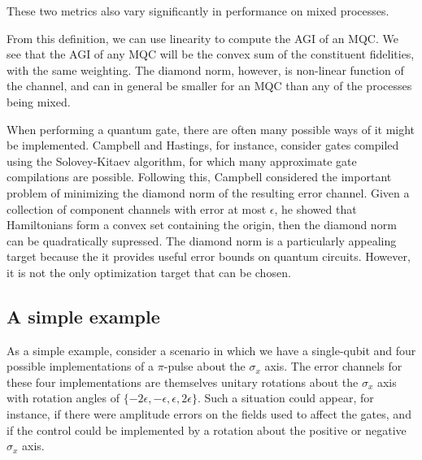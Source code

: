 \documentclass[aps,nofootinbib,pra,notitlepage,twocolumn]{revtex4-1}
\newcommand{\actual}{\ensuremath{\tilde{\mathsf{G}}}}
\newcommand{\error}{\ensuremath{{\mathsf{E}}}}
\begin{document}
These two metrics also vary significantly in performance on mixed processes.  

From this definition, we can use linearity to compute the AGI of an MQC. We see that the AGI of any MQC will be the convex sum of the constituent fidelities, with the same weighting. The diamond norm, however, is non-linear function of the channel, and can in general be smaller for an MQC than any of the processes being mixed. 


When performing a quantum gate, there are often many possible ways of it might be implemented. Campbell and Hastings, for instance, consider gates compiled using the Solovey-Kitaev algorithm, for which many approximate gate compilations are possible.\cite{Campbell2017, 1612.01011} Following this, Campbell considered the important problem of minimizing the diamond norm of the resulting error channel. Given a collection of component channels with error at most $\epsilon$, he showed that Hamiltonians form a convex set containing the origin, then the diamond norm can be quadratically supressed. The diamond norm is a particularly appealing target because the it provides useful error bounds on quantum circuits. However, it is not the only optimization target that can be chosen. 

\subsection{A simple example}
\label{sec:simple_example}
As a simple example, consider a scenario in which we have a single-qubit and four possible implementations of a $\pi$-pulse about the $\sigma_x$ axis. The error channels for these four implementations are themselves unitary rotations about the $\sigma_x$ axis with rotation angles of $\{-2\epsilon, -\epsilon, \epsilon, 2\epsilon\}$. Such a situation could appear, for instance, if there were amplitude errors on the fields used to affect the gates, and if the control could be implemented by a rotation about the positive or negative $\sigma_x$ axis.
\end{document}
